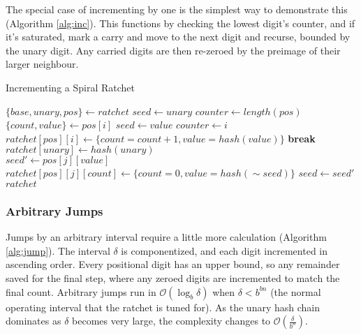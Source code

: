 \documentclass{article}
\begin{document}
	\FloatBarrier
	
	The special case of incrementing by one is the simplest way to demonstrate this (Algorithm \ref{alg:inc}). This functions by checking the lowest digit's counter, and if it's saturated, mark a carry and move to the next digit and recurse, bounded by the unary digit. Any carried digits are then re-zeroed by the preimage of their larger neighbour.
	
	\begin{algorithm}
		\caption{Incrementing a Spiral Ratchet}
		\label{alg:inc}

		\begin{algorithmic}[1]
				\State $\{base, unary, pos\} \gets ratchet$
				\State $seed \gets unary$
				\State $counter \gets length(pos)$
				\\
					\State $\{count, value\} \gets pos[i]$
					 
						\State $seed \gets value$
						\State $counter \gets i$
						\State $ratchet[pos][i] \gets \{ count = count + 1, value = hash(value)\}$
						\State \textbf{break}
					\EndIf
				\EndFor
				\\
				 
					\State $ratchet[unary] \gets hash(unary)$
				\EndIf
				\\
					 
						\State $seed' \gets pos[j][value]$
						\State $ratchet[pos][j][count] \gets \{count = 0, value = hash(\sim{seed})\}$
						\State $seed \gets seed'$
					\EndFor
				\EndIf
				\\
				\State $ratchet$
				\EndFunction
		\end{algorithmic}
	\end{algorithm}

	\subsubsection{Arbitrary Jumps}

	Jumps by an arbitrary interval require a little more calculation (Algorithm \ref{alg:jump}). The interval $\delta$ is componentized, and each digit incremented in ascending order. Every positional digit has an upper bound, so any remainder saved for the final step, where any zeroed digits are incremented to match the final count. Arbitrary jumps run in $\mathcal{O}(\log_{b} \delta)$ when $\delta < b^{bn}$ (the normal operating interval that the ratchet is tuned for). As the unary hash chain dominates as $\delta$ becomes very large, the complexity changes to $\mathcal{O}(\frac{\delta}{b^{n}})$. %
\end{document}
